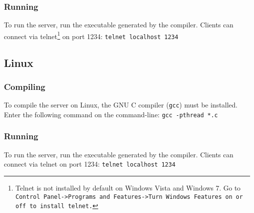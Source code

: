 \documentclass{article}
\begin{document}
\subsubsection*{Running}
To run the server, run the executable generated by the compiler. Clients can connect via telnet\footnote{Telnet is not installed by default on Windows Vista and Windows 7. Go to \texttt{Control Panel->Programs and Features->Turn Windows Features on or off to install telnet.}} on port 1234:
\newline\newline
\texttt{telnet localhost 1234}

\subsection{Linux}

\subsubsection*{Compiling}
To compile the server on Linux, the GNU C compiler (\texttt{gcc}) must be installed. Enter the following command on the command-line:\newline\newline
\texttt{gcc -pthread *.c}
\subsubsection*{Running}
To run the server, run the executable generated by the compiler. Clients can connect via telnet on port 1234:\newline\newline
\texttt{telnet localhost 1234}
\end{document}
